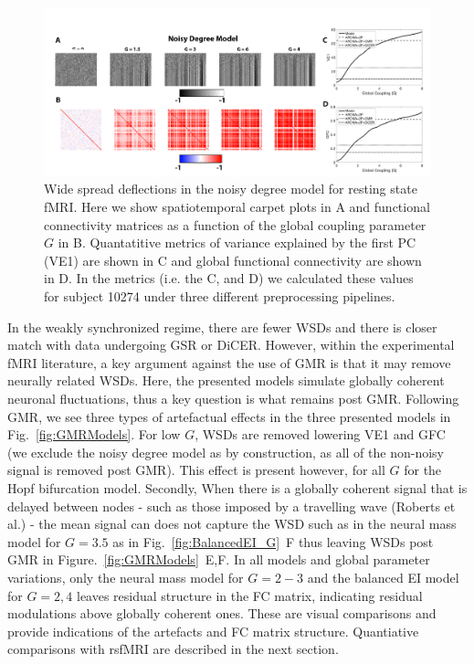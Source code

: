 \documentclass[oneside]{zHenriquesLab-StyleBioRxiv}
\begin{document}
\begin{figure}[ht!]
\includegraphics[width=1\textwidth]{figs/NDMModel.png}
\caption{Wide spread deflections in the noisy degree model for resting state fMRI. Here we show spatiotemporal carpet plots in A and functional connectivity matrices as a function of the global coupling parameter $G$ in B. Quantatitive metrics of variance explained by the first PC (VE1) are shown in C and global functional connectivity are shown in D. In the metrics (i.e. the C, and D) we calculated these values for subject 10274 under three different preprocessing pipelines.}\label{fig:NDM_G}
\end{figure}

In the weakly synchronized regime, there are fewer WSDs and there is closer match with data undergoing GSR or DiCER. However, within the experimental fMRI literature, a key argument against the use of GMR is that it may remove neurally related WSDs. Here, the presented models simulate globally coherent neuronal fluctuations, thus a key question is what remains post GMR. Following GMR, we see three types of artefactual effects in the three presented models in Fig.~\ref{fig:GMRModels}. For low $G$, WSDs are removed lowering VE1 and GFC (we exclude the noisy degree model as by construction, as all of the non-noisy signal is removed post GMR). This effect is present however, for all $G$ for the Hopf bifurcation model. Secondly, When there is a globally coherent signal that is delayed between nodes - such as those imposed by a travelling wave (Roberts et al.) - the mean signal can does not capture the WSD such as in the neural mass model for $G=3.5$ as in Fig.~\ref{fig:BalancedEI_G}~F thus leaving WSDs post GMR in Figure.~\ref{fig:GMRModels}~E,F. 
In all models and global parameter variations, only the neural mass model for $G=2-3$ and the balanced EI model for $G=2,4$ leaves residual structure in the FC matrix, indicating residual modulations above globally coherent ones. These are visual comparisons and provide indications of the artefacts and FC matrix structure. Quantiative comparisons with rsfMRI are described in the next section. 
\end{document}
